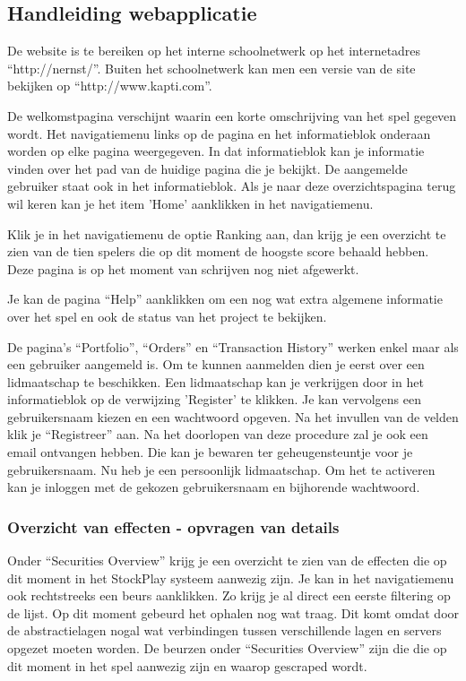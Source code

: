 \subsection{Handleiding webapplicatie}

De website is te bereiken op het interne schoolnetwerk op het internetadres ``http://nernst/''.
Buiten het schoolnetwerk kan men een versie van de site bekijken op ``http://www.kapti.com''.

De welkomstpagina verschijnt waarin een korte omschrijving van het spel gegeven wordt. Het navigatiemenu links op de pagina en het informatieblok onderaan worden op elke pagina weergegeven. In dat informatieblok kan je informatie vinden over het pad van de huidige pagina die je bekijkt. De aangemelde gebruiker staat ook in het informatieblok. Als je naar deze overzichtspagina terug wil keren kan je het item 'Home' aanklikken in het navigatiemenu.

Klik je in het navigatiemenu de optie Ranking aan, dan krijg je een overzicht te zien van de tien spelers die op dit moment de hoogste score behaald hebben.
Deze pagina is op het moment van schrijven nog niet afgewerkt.

Je kan de pagina ``Help'' aanklikken om een nog wat extra algemene informatie over het spel en ook de status van het project te bekijken.

De pagina's ``Portfolio'', ``Orders'' en ``Transaction History'' werken enkel maar als een gebruiker aangemeld is.
Om te kunnen aanmelden dien je eerst over een lidmaatschap te beschikken. Een lidmaatschap kan je verkrijgen door in het informatieblok op de verwijzing 'Register' te klikken. Je kan vervolgens een gebruikersnaam kiezen en een wachtwoord opgeven. Na het invullen van de velden klik je ``Registreer'' aan.
Na het doorlopen van deze procedure zal je ook een email ontvangen hebben. Die kan je bewaren ter geheugensteuntje voor je gebruikersnaam.
Nu heb je een persoonlijk lidmaatschap. Om het te activeren kan je inloggen met de gekozen gebruikersnaam en bijhorende wachtwoord.

\subsubsection{Overzicht van effecten - opvragen van details}

Onder ``Securities Overview'' krijg je een overzicht te zien van de effecten die op dit moment in het StockPlay systeem aanwezig zijn. Je kan in het navigatiemenu ook rechtstreeks een beurs aanklikken. Zo krijg je al direct een eerste filtering op de lijst.
Op dit moment gebeurd het ophalen nog wat traag. Dit komt omdat door de abstractielagen nogal wat verbindingen tussen verschillende lagen en servers opgezet moeten worden.
De beurzen onder ``Securities Overview'' zijn die die op dit moment in het spel aanwezig zijn en waarop gescraped wordt.

